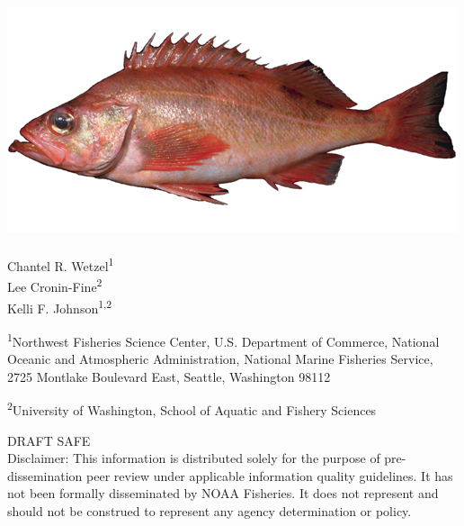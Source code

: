 
\begin{center}
\thispagestyle{empty}


\vspace{.5cm}

\includegraphics{Sebastes_alutus}~\\[0.5cm]



Chantel R. Wetzel\textsuperscript{1}\\
Lee Cronin-Fine\textsuperscript{2}\\
Kelli F. Johnson\textsuperscript{1,2}\\

\vspace{.5cm}

\small
\textsuperscript{1}Northwest Fisheries Science Center, U.S. Department of Commerce, National Oceanic and Atmospheric Administration, National Marine Fisheries Service, 2725 Montlake Boulevard East, Seattle, Washington 98112\\

\vspace{.3cm}

\textsuperscript{2}University of Washington, School of Aquatic and Fishery Sciences\\





\vspace{1cm}

\vfill
DRAFT SAFE\\
Disclaimer: This information is distributed solely for the purpose of pre-dissemination
peer review under applicable information quality guidelines. It has not been formally
disseminated by NOAA Fisheries. It does not represent and should not be construed to
represent any agency determination or policy. 




\end{center}
